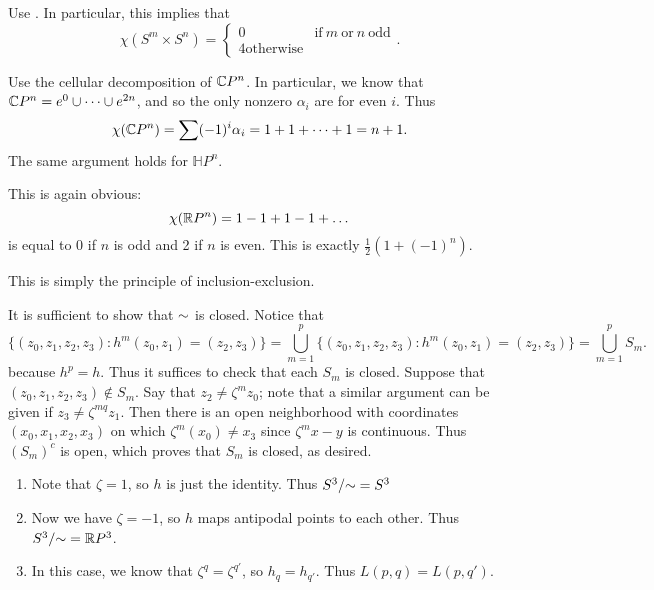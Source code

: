 \documentclass[../../solutions.tex]{subfiles}
\begin{document}
\begin{exercise} \leavevmode
Use .
In particular, this implies that
\[\chi(S^m\times S^n)=\begin{cases}0&\text{if}~m~\text{or}~n~\text{odd}\\4\text{otherwise}\end{cases}.\]
\end{exercise}

\begin{exercise} \leavevmode
Use the cellular decomposition of $\mathbb{C} P^n$.
In particular, we know that $\mathbb{C} P^n=e^0\cup\dots\cup e^{2n}$, and so the only nonzero $\alpha_i$ are for even $i$.
Thus
\[\chi(\mathbb{C} P^n)=\sum(-1)^i\alpha_i=1+1+\dots+1=n+1.\]
The same argument holds for $\mathbb H P^n$.
\end{exercise}

\begin{exercise} \leavevmode
This is again obvious:
\[\chi(\mathbb{R} P^n)=1-1+1-1+\dots\]
is equal to 0 if $n$ is odd and 2 if $n$ is even.
This is exactly $\frac12\left(1+(-1)^n\right)$.
\end{exercise}

\begin{exercise} \leavevmode
This is simply the principle of inclusion-exclusion.
\end{exercise}

\begin{exercise} \leavevmode
It is sufficient to show that ${\sim}$ is closed.
Notice that
\[\{(z_0,z_1,z_2,z_3):h^m(z_0,z_1)=(z_2,z_3)\}=\bigcup_{m=1}^p\{(z_0,z_1,z_2,z_3):h^m(z_0,z_1)=(z_2,z_3)\}=\bigcup_{m=1}^pS_m.\]
because $h^p=h$.
Thus it suffices to check that each $S_m$ is closed.
Suppose that $(z_0,z_1,z_2,z_3)\not\in S_m$.
Say that $z_2\ne\zeta^m z_0$; note that a similar argument can be given if $z_3\ne\zeta^{mq}z_1$.
Then there is an open neighborhood with coordinates $(x_0,x_1,x_2,x_3)$ on which $\zeta^m(x_0)\ne x_3$ since $\zeta^mx-y$ is continuous.
Thus $(S_m)^c$ is open, which proves that $S_m$ is closed, as desired.
\end{exercise}

\begin{exercise} \leavevmode
\begin{enumerate}
\item 
Note that $\zeta=1$, so $h$ is just the identity.
Thus $S^3/{\sim}=S^3$
\item
Now we have $\zeta=-1$, so $h$ maps antipodal points to each other.
Thus $S^3/{\sim}=\mathbb{R} P^3$.
\item
In this case, we know that $\zeta^q=\zeta^{q'}$, so $h_q=h_{q'}$.
Thus $L(p,q)=L(p,q')$.
\end{enumerate}
\end{exercise}
\end{document}

